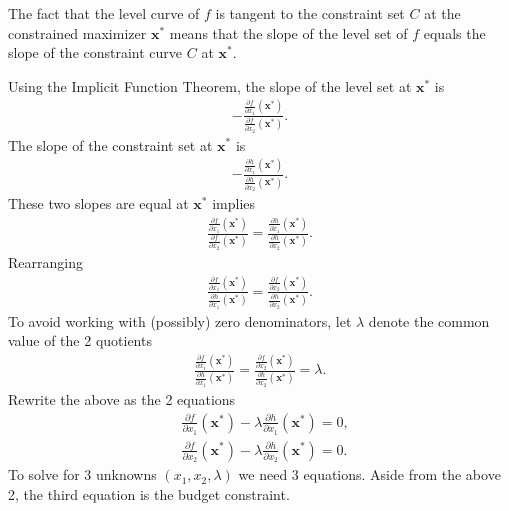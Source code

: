 \documentclass[10pt,a4paper]{book}
\theoremstyle{definition}\newtheorem{definition}{Definition}
\theoremstyle{definition}\newtheorem{fact}{Fact}
\theoremstyle{definition}\newtheorem{ex}{Ex.}
\theoremstyle{definition}\newtheorem{project}{Project}
\theoremstyle{definition}\newtheorem{problem}{Problem}
\theoremstyle{definition}\newtheorem{example}{Example}
\numberwithin{theorem}{chapter}
\numberwithin{corollary}{chapter}
\numberwithin{assumption}{chapter}
\numberwithin{definition}{chapter}
\numberwithin{prop}{chapter}
\numberwithin{notation}{chapter}
\numberwithin{problem}{chapter}
\numberwithin{example}{chapter}
\numberwithin{fact}{chapter}
\numberwithin{ex}{chapter}
\def\x{\mathbf x}
\begin{document}
	The fact that the level curve of $f$ is tangent to the constraint set $C$ at the constrained maximizer $\x^*$ means that the slope of the level set of $f$ equals the slope of the constraint curve $C$ at $\x^*$.
	
	Using the Implicit Function Theorem, the slope of the level set at $\x^*$ is
	\begin{align*}
		- \frac{\frac{\partial f}{\partial x_1} (\x^*)}{\frac{\partial f}{\partial x_2} (\x^*)}. 
	\end{align*} 
	The slope of the constraint set at $\x^*$ is
	\begin{align*}
		- \frac{\frac{\partial h}{\partial x_1} (\x^*)}{\frac{\partial h}{\partial x_2} (\x^*)}. 
	\end{align*} 
	These two slopes are equal at $\x^*$ implies
	\begin{align*}
		\frac{\frac{\partial f}{\partial x_1} (\x^*)}{\frac{\partial f}{\partial x_2} (\x^*)} = \frac{\frac{\partial h}{\partial x_1} (\x^*)}{\frac{\partial h}{\partial x_2} (\x^*)}. 
	\end{align*}
	Rearranging
	\begin{align}
		\label{eq:18-3} \frac{\frac{\partial f}{\partial x_1} (\x^*)}{\frac{\partial h}{\partial x_1} (\x^*)} = \frac{\frac{\partial f}{\partial x_2} (\x^*)}{\frac{\partial h}{\partial x_2} (\x^*)}. 
	\end{align}
	To avoid working with (possibly) zero denominators, let $\lambda$ denote the common value of the 2 quotients
	\begin{align*}
		\frac{\frac{\partial f}{\partial x_1} (\x^*)}{\frac{\partial h}{\partial x_1} (\x^*)} = \frac{\frac{\partial f}{\partial x_2} (\x^*)}{\frac{\partial h}{\partial x_2} (\x^*)} = \lambda. 
	\end{align*}
	Rewrite the above as the 2 equations
	\begin{align*}
		& \frac{\partial f}{\partial x_1} (\x^*) - \lambda \frac{\partial h}{\partial x_1} (\x^*) = 0, \\
		& \frac{\partial f}{\partial x_2} (\x^*) - \lambda \frac{\partial h}{\partial x_2} (\x^*) = 0. 
	\end{align*}
	To solve for 3 unknowns $(x_1, x_2, \lambda)$ we need 3 equations. Aside from the above 2, the third equation is the budget constraint.
	
\end{document}
